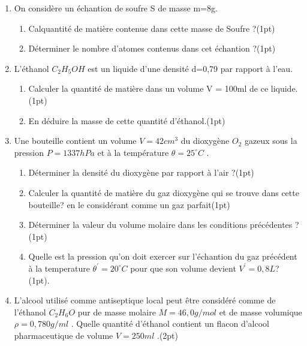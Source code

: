 \documentclass[12pt]{article}
\begin{document}
\begin{enumerate}
  \item On considère un échantion de soufre S de masse m=8g.
      \begin{enumerate}
          \item Calquantité de matière contenue dans cette masse de Soufre ?\dotfill(1pt)
          \item Déterminer le nombre d’atomes contenus dans cet échantion ?\dotfill(1pt)
      \end{enumerate}
    \item L'éthanol $C_2H_5OH$ est un liquide d'une densité d=0,79 par rapport à l'eau.
        \begin{enumerate}
                \item Calculer la quantité de matière dans un volume V = 100ml de ce liquide.\dotfill(1pt)
                \item  En déduire la masse de cette quantité d’éthanol.\dotfill(1pt)
        \end{enumerate}
    \item Une bouteille contient un volume $V=42cm^3$ du dioxygène $O_2$ gazeux sous la pression $P=1337hPa$ et à la température $\theta = 25^{\circ} C$ .
        \begin{enumerate}
            \item Déterminer la densité du dioxygène par rapport à l’air ?\dotfill(1pt)
            \item  Calculer la quantité de matière du gaz dioxygène qui se trouve dans cette bouteille? en le considérant comme un gaz parfait\dotfill(1pt)

            \item Déterminer la valeur du volume molaire dans les conditions précédentes ?\dotfill(1pt)
            \item  Quelle est la pression qu’on doit exercer sur l’échantion du gaz précédent à la temperature \hspace{50pt}$ \theta^{'} = 20^{\circ}C$ pour que son volume devient $V^{'}=0,8L$? \dotfill(1pt).
                
        \end{enumerate}

    \item  L’alcool utilisé comme antiseptique local peut être considéré comme de l’éthanol $C_2H_6O$ pur de masse molaire $M = 46, 0g/mol$ et de masse volumique $\rho = 0, 780g/ml$ . Quelle quantité d’éthanol contient un flacon d’alcool pharmaceutique de volume $V = 250ml$ .\dotfill(2pt)
        



\end{enumerate}
\end{document}
